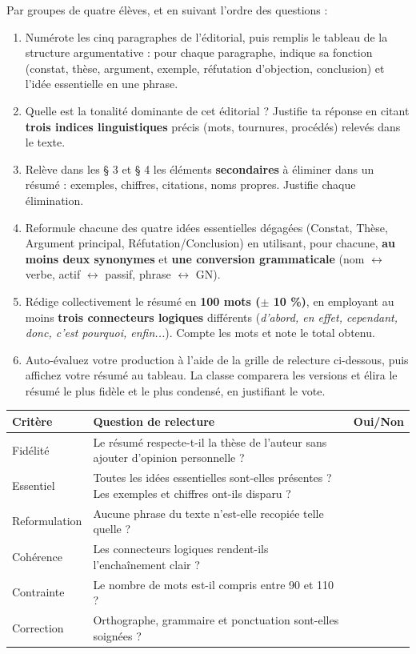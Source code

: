 \documentclass[11pt]{article}
\newcommand{\cle}[1]{{\popxbold\color{popdark}#1}}
\newcounter{popsec}
\newcounter{popsub}
\newcommand{\courssub}[1]{%
  \stepcounter{popsub}%
  \par\vspace{9pt}\noindent{\popxbold\fontsize{11.5}{13}\selectfont\color{popink}{\color{poporange}\thepopsec.\thepopsub}\hspace{6pt}#1}\par\nopagebreak\vspace{4pt}
}
\begin{document}
\courssub{Consignes}

Par groupes de quatre élèves, et en suivant l'ordre des questions :

\begin{enumerate}
\item Numérote les cinq paragraphes de l'éditorial, puis remplis le tableau de la structure argumentative : pour chaque paragraphe, indique sa fonction (constat, thèse, argument, exemple, réfutation d'objection, conclusion) et l'idée essentielle en une phrase.
\item Quelle est la \cle{tonalité} dominante de cet éditorial ? Justifie ta réponse en citant \textbf{trois indices linguistiques} précis (mots, tournures, procédés) relevés dans le texte.
\item Relève dans les § 3 et § 4 les éléments \textbf{secondaires} à éliminer dans un résumé : exemples, chiffres, citations, noms propres. Justifie chaque élimination.
\item Reformule chacune des quatre idées essentielles dégagées (Constat, Thèse, Argument principal, Réfutation/Conclusion) en utilisant, pour chacune, \textbf{au moins deux synonymes} et \textbf{une conversion grammaticale} (nom $\leftrightarrow$ verbe, actif $\leftrightarrow$ passif, phrase $\leftrightarrow$ GN).
\item Rédige collectivement le résumé en \textbf{100 mots ($\pm$ 10 \%)}, en employant au moins \textbf{trois connecteurs logiques} différents (\emph{d'abord, en effet, cependant, donc, c'est pourquoi, enfin...}). Compte les mots et note le total obtenu.
\item Auto-évaluez votre production à l'aide de la grille de relecture ci-dessous, puis affichez votre résumé au tableau. La classe comparera les versions et élira le résumé le plus fidèle et le plus condensé, en justifiant le vote.
\end{enumerate}

\begin{center}
\begin{tabularx}{\linewidth}{|l|X|c|}\hline
\rowcolor{popblueL} \textbf{Critère} & \textbf{Question de relecture} & \textbf{Oui/Non} \\ \hline
Fidélité & Le résumé respecte-t-il la thèse de l'auteur sans ajouter d'opinion personnelle ? & \\ \hline
Essentiel & Toutes les idées essentielles sont-elles présentes ? Les exemples et chiffres ont-ils disparu ? & \\ \hline
Reformulation & Aucune phrase du texte n'est-elle recopiée telle quelle ? & \\ \hline
Cohérence & Les connecteurs logiques rendent-ils l'enchaînement clair ? & \\ \hline
Contrainte & Le nombre de mots est-il compris entre 90 et 110 ? & \\ \hline
Correction & Orthographe, grammaire et ponctuation sont-elles soignées ? & \\ \hline
\end{tabularx}
\end{center}
\end{document}
